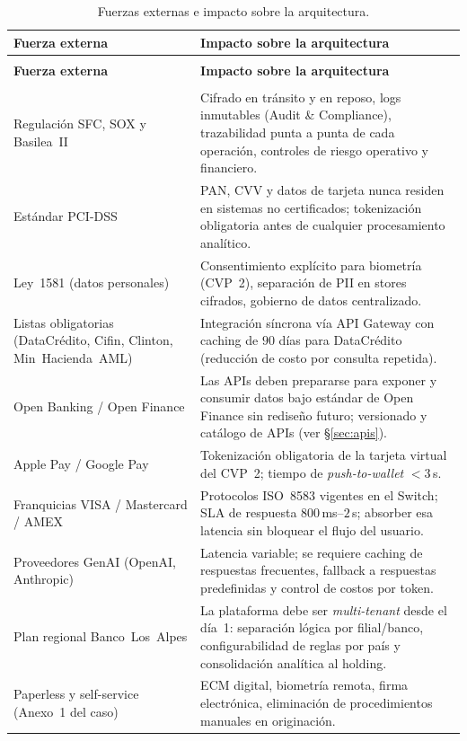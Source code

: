 \documentclass[11pt,letterpaper]{article}
\begin{document}
{\small
\renewcommand{\arraystretch}{1.25}
\begin{xltabular}{\textwidth}{@{}>{\RaggedRight\arraybackslash}p{4.6cm}@{\hspace{8pt}}>{\RaggedRight\arraybackslash}X@{}}
\caption{Fuerzas externas e impacto sobre la arquitectura.\label{tab:fuerzas}}\\
\toprule
\textbf{Fuerza externa} & \textbf{Impacto sobre la arquitectura} \\
\midrule
\endfirsthead
{}\\
\toprule
\textbf{Fuerza externa} & \textbf{Impacto sobre la arquitectura} \\
\midrule
\endhead
\midrule
{}\\
\endfoot
\bottomrule
\endlastfoot
Regulación SFC, SOX y Basilea~II & Cifrado en tránsito y en reposo, logs
inmutables (Audit \& Compliance), trazabilidad punta a punta de cada
operación, controles de riesgo operativo y financiero. \\
Estándar PCI-DSS & PAN, CVV y datos de tarjeta nunca residen en sistemas
no certificados; tokenización obligatoria antes de cualquier procesamiento
analítico. \\
Ley~1581 (datos personales) & Consentimiento explícito para biometría
(CVP~2), separación de PII en stores cifrados, gobierno de datos centralizado. \\
Listas obligatorias (DataCrédito, Cifin, Clinton, Min~Hacienda~AML) &
Integración síncrona vía API Gateway con caching de $90$ días para
DataCrédito (reducción de costo por consulta repetida). \\
Open Banking / Open Finance & Las APIs deben prepararse para exponer y
consumir datos bajo estándar de Open Finance sin rediseño futuro;
versionado y catálogo de APIs (ver \S\ref{sec:apis}). \\
Apple Pay / Google Pay & Tokenización obligatoria de la tarjeta virtual
del CVP~2; tiempo de \emph{push-to-wallet} $<3$\,s. \\
Franquicias VISA / Mastercard / AMEX & Protocolos ISO~8583 vigentes en el
Switch; SLA de respuesta $800$\,ms--$2$\,s; absorber esa latencia sin
bloquear el flujo del usuario. \\
Proveedores GenAI (OpenAI, Anthropic) & Latencia variable; se requiere
caching de respuestas frecuentes, fallback a respuestas predefinidas y
control de costos por token. \\
Plan regional Banco~Los~Alpes & La plataforma debe ser \emph{multi-tenant}
desde el día~1: separación lógica por filial/banco, configurabilidad de
reglas por país y consolidación analítica al holding. \\
Paperless y self-service (Anexo~1 del caso) & ECM digital, biometría
remota, firma electrónica, eliminación de procedimientos manuales en
originación. \\
\end{xltabular}}
\end{document}

